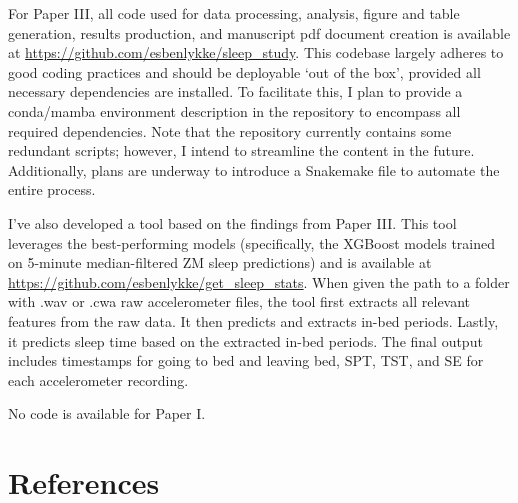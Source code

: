 \documentclass[
  10pt,
]{scrbook}
\begin{document}
For Paper III, all code used for data processing, analysis, figure and
table generation, results production, and manuscript pdf document
creation is available at
\url{https://github.com/esbenlykke/sleep_study}. This codebase largely
adheres to good coding practices and should be deployable `out of the
box', provided all necessary dependencies are installed. To facilitate
this, I plan to provide a conda/mamba environment description in the
repository to encompass all required dependencies. Note that the
repository currently contains some redundant scripts; however, I intend
to streamline the content in the future. Additionally, plans are
underway to introduce a Snakemake file to automate the entire process.

I've also developed a tool based on the findings from Paper III. This
tool leverages the best-performing models (specifically, the XGBoost
models trained on 5-minute median-filtered ZM sleep predictions) and is
available at \url{https://github.com/esbenlykke/get_sleep_stats}. When
given the path to a folder with .wav or .cwa raw accelerometer files,
the tool first extracts all relevant features from the raw data. It then
predicts and extracts in-bed periods. Lastly, it predicts sleep time
based on the extracted in-bed periods. The final output includes
timestamps for going to bed and leaving bed, SPT, TST, and SE for each
accelerometer recording.

No code is available for Paper I.

\hypertarget{references}{%
\chapter{References}\label{references}}
\end{document}
